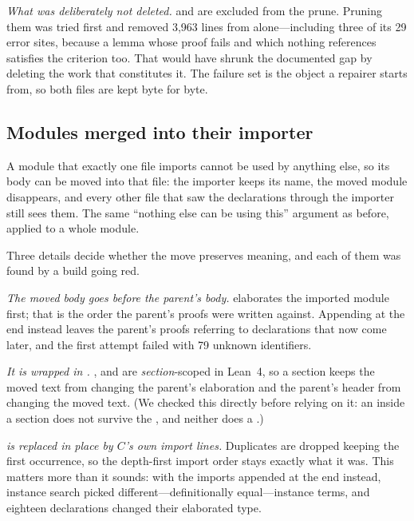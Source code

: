 \emph{What was deliberately not deleted.}  and
 are excluded from the prune. Pruning them was tried
first and removed 3{,}963 lines from  alone---including three of its
29 error sites, because a lemma whose proof fails and which nothing references satisfies the
criterion too. That would have shrunk the documented gap by deleting the work that
constitutes it. The failure set is the object a repairer starts from, so both files are kept
byte for byte.

\subsection{Modules merged into their importer}
\label{sec:merge}

A module that exactly one file imports cannot be used by anything else, so its body can be
moved into that file: the importer keeps its name, the moved module disappears, and every
other file that saw the declarations through the importer still sees them. The same
``nothing else can be using this'' argument as before, applied to a whole module.

Three details decide whether the move preserves meaning, and each of them was found by a
build going red.

\emph{The moved body goes before the parent's body.}  elaborates the imported
module first; that is the order the parent's proofs were written against. Appending at the
end instead leaves the parent's proofs referring to declarations that now come later, and the
first attempt failed with 79 unknown identifiers.

\emph{It is wrapped in   .} ,  and
 are \emph{section}-scoped in Lean~4, so a section keeps the moved text from
changing the parent's elaboration and the parent's header from changing the moved text. (We
checked this directly before relying on it: an  inside a section does not survive
the , and neither does a .)

\emph{ is replaced in place by $C$'s own import lines.} Duplicates are dropped
keeping the first occurrence, so the depth-first import order stays exactly what it was.
This matters more than it sounds: with the imports appended at the end instead, instance
search picked different---definitionally equal---instance terms, and eighteen declarations
changed their elaborated type.

